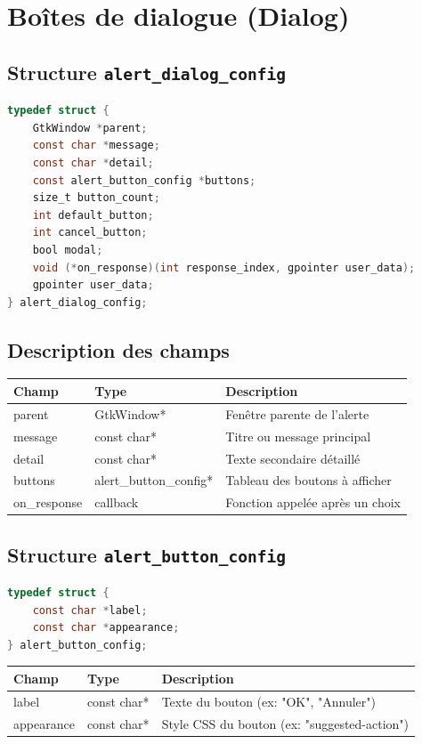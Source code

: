 \section{Boîtes de dialogue (Dialog)}

\subsection{Structure \texttt{alert\_dialog\_config}}
\begin{lstlisting}[language=C]
typedef struct {
    GtkWindow *parent;
    const char *message;
    const char *detail;
    const alert_button_config *buttons;
    size_t button_count;
    int default_button;
    int cancel_button;
    bool modal;
    void (*on_response)(int response_index, gpointer user_data);
    gpointer user_data;
} alert_dialog_config;
\end{lstlisting}

\subsection{Description des champs}
\begin{center}
\begin{tabular}{|l|l|p{5cm}|}
\hline
\textbf{Champ} & \textbf{Type} & \textbf{Description} \\
\hline
parent & GtkWindow* & Fenêtre parente de l'alerte \\
\hline
message & const char* & Titre ou message principal \\
\hline
detail & const char* & Texte secondaire détaillé \\
\hline
buttons & alert\_button\_config* & Tableau des boutons à afficher \\
\hline
on\_response & callback & Fonction appelée après un choix \\
\hline
\end{tabular}
\end{center}
\subsection{Structure \texttt{alert\_button\_config}}
\begin{lstlisting}[language=C]
typedef struct {
    const char *label;
    const char *appearance;
} alert_button_config;
\end{lstlisting}
\begin{center}
\begin{tabular}{|l|l|>{\raggedright\arraybackslash}p{6cm}|}
\hline
\textbf{Champ} & \textbf{Type} & \textbf{Description} \\
\hline
label & const char* & Texte du bouton (ex: "OK", "Annuler") \\
\hline
appearance & const char* & Style CSS du bouton (ex: "suggested-action") \\
\hline
\end{tabular}
\end{center}